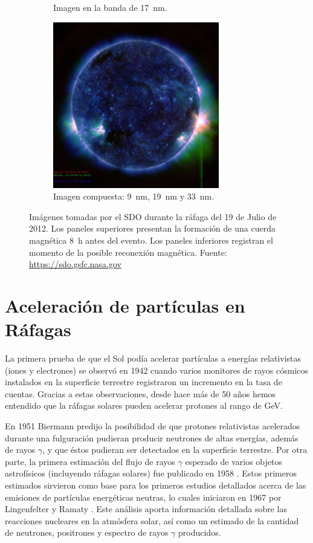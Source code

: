 \begin{figure}
\begin{subfigure}[b]{0.49\textwidth}
                \caption*{Imagen en la banda de \SI{17}{\nano\metre}.}
        \end{subfigure}
        \begin{subfigure}[b]{0.49\textwidth}
                \includegraphics[width=7.25cm]{sdo120719-0555-c}
                \caption*{Imagen compuesta: \SI{9}{\nano\metre}, \SI{19}{\nano\metre} y \SI{33}{\nano\metre}.}
        \end{subfigure}
        \caption{Imágenes tomadas por el SDO durante la ráfaga del \num{19} de Julio de \num{2012}. Los paneles superiores presentan la formación de una cuerda magnética \SI{8}{\hour} antes del evento. Los paneles inferiores registran el momento de la posible reconexión magnética. Fuente: \url{https://sdo.gsfc.nasa.gov}}
        \label{fig:flare-euv}
\end{figure}

\section{Aceleración de partículas en Ráfagas}

La primera prueba de que el Sol podía acelerar partículas a energías relativistas (iones y electrones) se observó en \num{1942} cuando varios monitores de rayos cósmicos instalados en la superficie terrestre registraron un incremento en la tasa de cuentas. Gracias a estas observaciones, desde hace más de \num{50} años hemos entendido que la ráfagas solares pueden acelerar protones al rango de \si{\giga\electronvolt}.

En \num{1951} Biermann \cite{bierman51} predijo la posibilidad de que protones relativistas acelerados durante una fulguración pudieran producir neutrones de altas energías, además de rayos $\gamma$, y que éstos pudieran ser detectados en la superficie terrestre. Por otra parte, la primera estimación del flujo de rayos $\gamma$ esperado de varios objetos astrofísicos (incluyendo ráfagas solares) fue publicado en \num{1958} \cite{morrison58}. Estos primeros estimados sirvieron como base para los primeros estudios detallados acerca de las emisiones de partículas energéticas neutras, lo cuales iniciaron en \num{1967} por Lingenfelter y Ramaty \cite{lingen67}. Este análisis aporta información detallada sobre las reacciones nucleares en la atmósfera solar, así como un estimado de la cantidad de neutrones, positrones y espectro de rayos $\gamma$ producidos.

